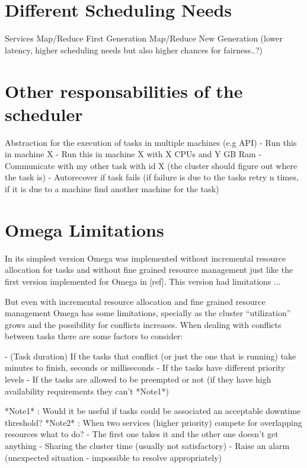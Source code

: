 \documentclass{svjour3}                     %
\begin{document}
\section{Different Scheduling Needs}

Services
Map/Reduce First Generation
Map/Reduce New Generation (lower latency, higher scheduling needs but also higher
chances for fairness..?)


\section{Other responsabilities of the scheduler}

Abstraction for the execution of tasks in multiple machines (e.g API)
  - Run this in machine X
  - Run this in machine X with X CPUs and Y GB Ram
  - Communicate with my other task with id X (the cluster should figure out where the task is)
  - Autorecover if task fails (if failure is due to the tasks retry n times, if it is due
    to a machine find another machine for the task)


\section{Omega Limitations}

In its simplest version Omega was implemented without incremental resource allocation for 
tasks and without fine grained resource management just like the first version implemented
for Omega in [ref]. This version had limitations ... 

But even with incremental resource allocation and fine grained resource management Omega
has some limitations, specially as the cluster ``utilization'' grows and the possibility for 
conflicts increases. When dealing with conflicts between tasks there are some factors to consider:

 - (Task duration) If the tasks that conflict (or just the one that is running) take
   minutes to finish, seconds or milliseconds
 - If the tasks have different priority levels
 - If the tasks are allowed to be preempted or not (if they have high availability 
   requirements they can't *Note1*)
   



   
*Note1* : Would it be useful if tasks could be associated an acceptable downtime threshold?
*Note2* : When two services (higher priority) compete for overlapping resources what to do?
 - The first one takes it and the other one doesn't get anything
 - Sharing the cluster time (usually not satisfactory)
 - Raise an alarm (unexpected situation - impossible to resolve appropriately)
 
\end{document}
